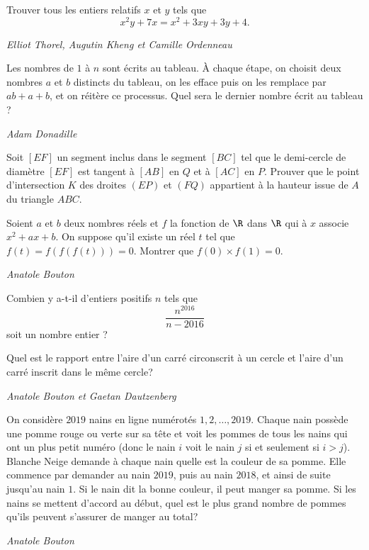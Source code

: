 \begin{exo}{}
Trouver tous les entiers relatifs $x$ et $y$ tels que \[x^2y+7x=x^2+3xy+3y+4.\]

\medskip
\textit{Elliot Thorel, Augutin Kheng et Camille Ordenneau}
\end{exo}

\begin{exo}{}
Les nombres de $1$ à $n$ sont écrits au tableau. \`A chaque étape, on choisit deux nombres $a$ et $b$ distincts du tableau, on les efface puis on les remplace par $ab+a+b$, et on réitère ce processus. Quel sera le dernier nombre écrit au tableau ?

\medskip
\textit{Adam Donadille}
\end{exo}

\begin{exo}{}Soit $[EF]$ un segment inclus dans le segment $[BC]$ tel que le demi-cercle de diamètre $[EF]$ est tangent à $[AB]$ en $Q$ et à $[AC]$ en $P$. Prouver que le point d'intersection $K$ des droites $(EP)$ et $(FQ)$ appartient à la hauteur issue de $A$ du triangle $ABC$.
\end{exo}

\begin{exo}{}
Soient $a$ et $b$ deux nombres réels et $f$ la fonction de $\R$ dans $\R$ qui à $x$ associe $x^2+ax+b$. On suppose qu'il existe un réel $t$ tel que $f(t)=f(f(f(t)))=0$. Montrer que $f(0) \times f(1)=0$.

\medskip
\textit{Anatole Bouton}
\end{exo}

\begin{exo}{}
Combien y a-t-il d'entiers positifs $n$ tels que
\[\frac{n^{2016}}{n-2016}\]
soit un nombre entier ?
\end{exo}

\begin{exo}{}
Quel est le rapport entre l'aire d'un carré circonscrit à un cercle et l'aire d'un carré inscrit dans le même cercle?

\medskip
\textit{Anatole Bouton et Gaetan Dautzenberg}
\end{exo}

\begin{exo}{}
On considère $2019$ nains en ligne numérotés $1,2,\dots,2019$. Chaque nain possède une pomme rouge ou verte sur sa tête et voit les pommes de tous les nains qui ont un plus petit numéro (donc le nain $i$ voit le nain $j$ si et seulement si $i>j$). Blanche Neige demande à chaque nain quelle est la couleur de sa pomme. Elle commence par demander au nain $2019$, puis au nain $2018$, et ainsi de suite jusqu'au nain $1$. Si le nain dit la bonne couleur, il peut manger sa pomme. Si les nains se mettent d'accord au début, quel est le plus grand nombre de pommes qu'ils peuvent s'assurer de manger au total?

\medskip
\textit{Anatole Bouton}

\end{exo}

